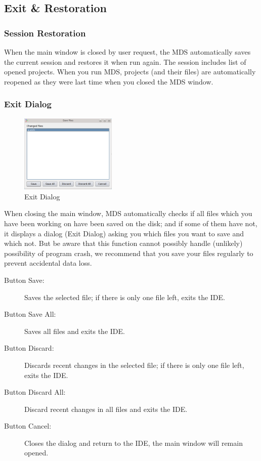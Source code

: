     \clearpage
    \subsection{Exit \& Restoration}
        \subsubsection{Session Restoration}
            When the main window is closed by user request, the MDS automatically saves the current session and restores it when run again. The session includes list of opened projects. When you run MDS, projects (and their files) are automatically reopened as they were last time when you closed the MDS window.

        \subsubsection{Exit Dialog}
            \begin{figure}
                \centering
                \includegraphics[width=130pt]{img/exit_dialog.png}
                \caption{Exit Dialog}
            \end{figure}

            When closing the main window, MDS automatically checks if all files which you have been working on have been saved on the disk; and if some of them have not, it displays a dialog (Exit Dialog) asking you which files you want to save and which not. But be aware that this function cannot possibly handle (unlikely) possibility of program crash, we recommend that you save your files regularly to prevent accidental data loss.

            \begin{description}
                \item[Button Save:] Saves the selected file; if there is only one file left, exits the IDE.
                \item[Button Save All:] Saves all files and exits the IDE.
                \item[Button Discard:] Discards recent changes in the selected file; if there is only one file left, exits the IDE.
                \item[Button Discard All:] Discard recent changes in all files and exits the IDE.
                \item[Button Cancel:] Closes the dialog and return to the IDE, the main window will remain opened.
            \end{description}

